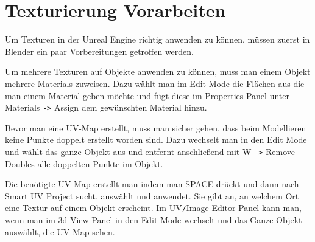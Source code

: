 \section{Texturierung Vorarbeiten}
Um Texturen in der Unreal Engine richtig anwenden zu können, müssen zuerst in Blender ein paar Vorbereitungen getroffen werden.

Um mehrere Texturen auf Objekte anwenden zu können, muss man einem Objekt mehrere Materials zuweisen. Dazu wählt man im Edit Mode die Flächen aus die man einem Material geben
möchte und fügt diese im Properties-Panel unter Materials \verb+->+ Assign dem gewünschten Material hinzu.

Bevor man eine UV-Map erstellt, muss man sicher gehen, dass beim Modellieren keine Punkte
doppelt erstellt worden sind. Dazu wechselt man in den Edit Mode und wählt das ganze Objekt aus und entfernt anschließend mit W \verb+->+
Remove Doubles alle doppelten Punkte im Objekt.

Die benötigte UV-Map erstellt man indem man SPACE drückt und dann nach Smart UV Project sucht, auswählt und anwendet. Sie gibt an, an welchem Ort
eine Textur auf einem Objekt erscheint. Im UV\verb-/-Image Editor Panel kann man, wenn man im 3d-View Panel in den Edit Mode
wechselt und das Ganze Objekt auswählt, die UV-Map sehen.
